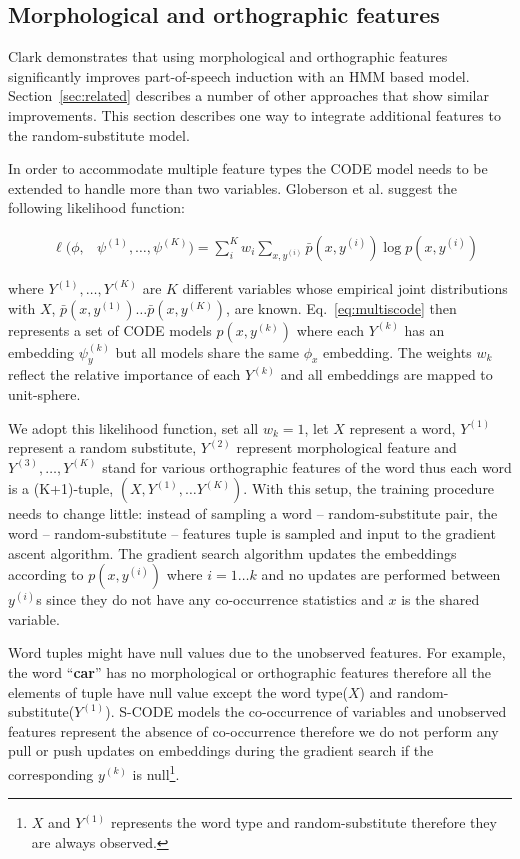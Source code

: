 \subsection{Morphological and orthographic features}
\label{sec:feat}

Clark  demonstrates that
using morphological and orthographic features significantly improves
part-of-speech induction with an HMM based model.
Section~\ref{sec:related} describes a number of other approaches that
show similar improvements.  This section describes one way to
integrate additional features to the random-substitute model.

In order to accommodate multiple feature types the CODE model needs to
be extended to handle more than two variables.  Globerson et
al.  suggest the following
likelihood function:

\begin{eqnarray}
&\ell(\phi,& \psi^{(1)}, \ldots, \psi^{(K)}) = \label{eq:multiscode} \sum_i^K w_i \sum_{x,y^{(i)}} \bar{p}(x,y^{(i)}) \log p(x,y^{(i)})
\end{eqnarray}

\noindent where $Y^{(1)}, \ldots, Y^{(K)}$ are $K$ different variables
whose empirical joint distributions with $X$,
$\bar{p}(x,y^{(1)})\ldots\bar{p}(x,y^{(K)})$, are known.
Eq.~\ref{eq:multiscode} then represents a set of CODE models
$p(x,y^{(k)})$ where each $Y^{(k)}$ has an embedding $\psi_y^{(k)}$
but all models share the same $\phi_x$ embedding.  The weights $w_k$
reflect the relative importance of each $Y^{(k)}$ and all embeddings
are mapped to unit-sphere.

We adopt this likelihood function, set all $w_k=1$, let $X$ represent
a word, $Y^{(1)}$ represent a random substitute, $Y^{(2)}$ represent
morphological feature and $Y^{(3)}, \ldots, Y^{(K)}$ stand for various
orthographic features of the word thus each word is a (K+1)-tuple,
$(X, Y^{(1)}, \hdots Y^{(K)})$.  With this setup, the training
procedure needs to change little: instead of sampling a word --
random-substitute pair, the word -- random-substitute -- features
tuple is sampled and input to the gradient ascent algorithm.  The
gradient search algorithm updates the embeddings according to
$p(x,y^{(i)})$ where $i=1\hdots k$ and no updates are performed
between $y^{(i)}$s since they do not have any co-occurrence statistics
and $x$ is the shared variable.


Word tuples might have null values due to the unobserved features.
For example, the word ``\textbf{car}'' has no morphological or
orthographic features therefore all the elements of tuple have null
value except the word type($X$) and random-substitute($Y^{(1)}$).
S-CODE models the co-occurrence of variables and unobserved features
represent the absence of co-occurrence therefore we do not perform any
pull or push updates on embeddings during the gradient search if the
corresponding $y^{(k)}$ is null\footnote{$X$ and $Y^{(1)}$ represents
  the word type and random-substitute therefore they are always
  observed.}.

